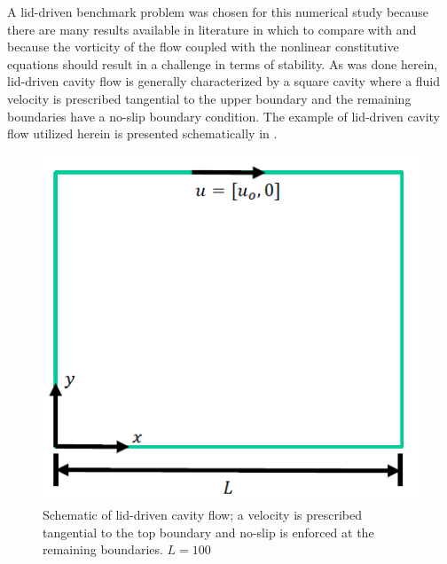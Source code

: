 A lid-driven benchmark problem was chosen for this numerical study because there are many results available in literature in which to compare with and because the vorticity of the flow coupled with the nonlinear constitutive equations should result in a challenge in terms of stability.
As was done herein, lid-driven cavity flow is generally characterized by a square cavity where a fluid velocity is prescribed tangential to the upper boundary and the remaining boundaries have a no-slip boundary condition.
The example of lid-driven cavity flow utilized herein is presented schematically in .

\begin{figure}
\centering
\includegraphics{figs/lid-driven}
\caption{Schematic of lid-driven cavity flow; a velocity is prescribed tangential to the top boundary and no-slip is enforced at the remaining boundaries. $L = 100$}
\label{fig:lid-driven}
\end{figure}

